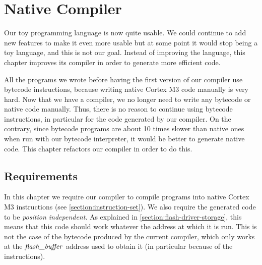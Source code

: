 
\renewcommand{\rustfile}{chapter8}
\setcounter{rustid}{0}


\chapter{Native Compiler}\label{chapter:native-compiler}

Our toy programming language is now quite usable. We could continue to add new
features to make it even more usable but at some point it would stop being a
toy language, and this is not our goal. Instead of improving the language, this
chapter improves its compiler in order to generate more efficient code.

All the programs we wrote before having the first version of our compiler use
bytecode instructions, because writing native Cortex M3 code manually is very
hard. Now that we have a compiler, we no longer need to write any bytecode or
native code manually. Thus, there is no reason to continue using bytecode
instructions, in particular for the code generated by our compiler. On the
contrary, since bytecode programs are about 10 times slower than native ones
when run with our bytecode interpreter, it would be better to generate native
code. This chapter refactors our compiler in order to do this.

\section{Requirements}

In this chapter we require our compiler to compile programs into native Cortex
M3 instructions (see \cref{section:instruction-set}). We also require the
generated code to be {\em position independent}. As explained in
\cref{section:flash-driver-storage}, this means that this code should work
whatever the address at which it is run. This is not the case of the
bytecode produced by the current compiler, which only works at the
$\it{flash\_buffer}$ address used to obtain it (in particular because of the
 instructions).

